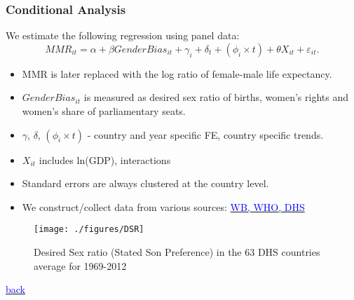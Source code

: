 \documentclass[10pt,letterpaper,subeqn]{beamer}
\begin{document}
\begin{frame}[label=CC]
\frametitle{Conditional Analysis}
We estimate the following regression using panel data:
	\begin{equation}
		MMR_{it} = \alpha + \beta GenderBias_{it} + \gamma_i + \delta_t + 
               (\phi_i\times t) + \theta X_{it} + \varepsilon_{it}. \nonumber
	\end{equation}
\vspace{4mm}
    \begin{itemize}
\setlength{\itemsep}{8pt}
	\item MMR is later replaced with the log ratio of female-male life expectancy.
  \item $GenderBias_{it}$ is measured as desired sex ratio of births, women's 
        rights and women's share of parliamentary seats.
	\item $\gamma$, $\delta$, $(\phi_i\times t)$ - country and year specific FE,
        country specific trends.  
  \item $X_{it}$ includes ln(GDP), interactions
	\item Standard errors are always clustered at the country level.
  \item We construct/collect data from various
        sources: \hyperlink{sumstatsWorld}{\textcolor{blue}{WB, WHO, DHS}}
\end{itemize}
\end{frame}

\begin{frame}[plain,label=DSRMap]
\begin{figure}[h!]
\centering
\texttt{[image: ./figures/DSR]}
\caption{Desired Sex ratio (Stated Son Preference) in the 63 DHS countries average for 1969-2012}
\end{figure}
{\footnotesize \hyperlink{DSR}{\textcolor{blue}{back}}}
\end{frame}
\end{document}
